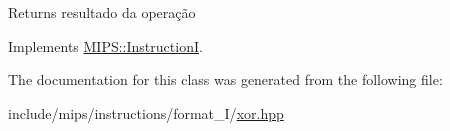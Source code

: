 \begin{DoxyReturn}{Returns}
resultado da operação 
\end{DoxyReturn}


Implements \hyperlink{classMIPS_1_1InstructionI_ae60fca5801bf5415cdff06d2aa11764f}{M\+I\+P\+S\+::\+InstructionI}.



The documentation for this class was generated from the following file\+:\begin{DoxyCompactItemize}
\item 
include/mips/instructions/format\+\_\+\+I/\hyperlink{xor_8hpp}{xor.\+hpp}\end{DoxyCompactItemize}
